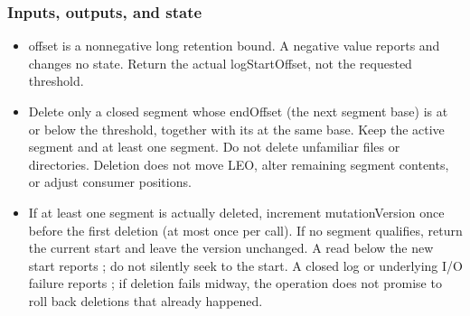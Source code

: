 \subsubsection*{Inputs, outputs, and state}
\begin{itemize}
\item offset is a nonnegative long retention bound. A negative value reports  and changes no state. Return the actual logStartOffset, not the requested threshold.
\item Delete only a closed segment whose endOffset (the next segment base) is at or below the threshold, together with its  at the same base. Keep the active segment and at least one segment. Do not delete unfamiliar files or directories. Deletion does not move LEO, alter remaining segment contents, or adjust consumer positions.
\item If at least one segment is actually deleted, increment mutationVersion once before the first deletion (at most once per call). If no segment qualifies, return the current start and leave the version unchanged. A read below the new start reports ; do not silently seek to the start. A closed log or underlying I/O failure reports ; if deletion fails midway, the operation does not promise to roll back deletions that already happened.
\end{itemize}
